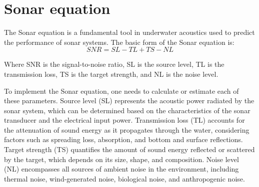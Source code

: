 \section{Sonar equation }
The Sonar equation is a fundamental tool in underwater acoustics used to predict the performance of sonar systems. 
The basic form of the Sonar equation is:
\begin{equation}
    SNR=SL-TL+TS-NL
\end{equation}

Where
SNR is the signal-to-noise ratio,
SL is the source level,
TL is the transmission loss,
TS is the target strength, and
NL is the noise level.

To implement the Sonar equation, one needs to calculate or estimate each of these parameters. 
Source level (SL) represents the acoustic power radiated by the sonar system, which can be determined based on the characteristics of the sonar transducer and the electrical input power. 
Transmission loss (TL) accounts for the attenuation of sound energy as it propagates through the water, considering factors such as spreading loss, absorption, and bottom and surface reflections. 
Target strength (TS) quantifies the amount of sound energy reflected or scattered by the target, which depends on its size, shape, and composition. 
Noise level (NL) encompasses all sources of ambient noise in the environment, including thermal noise, wind-generated noise, biological noise, and anthropogenic noise.

